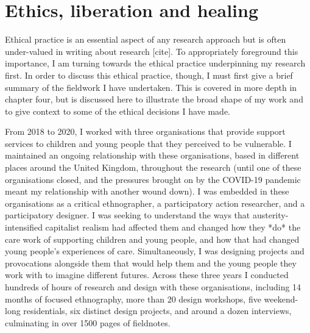 





\section{Ethics, liberation and healing}
\label{3-ethics}
Ethical practice is an essential aspect of any research approach but is often under-valued in writing about research [cite]. To appropriately foreground this importance, I am turning towards the ethical practice underpinning my research first. In order to discuss this ethical practice, though, I must first give a brief summary of the fieldwork I have undertaken. This is covered in more depth in chapter four, but is discussed here to illustrate the broad shape of my work and to give context to some of the ethical decisions I have made.

From 2018 to 2020, I worked with three organisations that provide support services to children and young people that they perceived to be vulnerable. I maintained an ongoing relationship with these organisations, based in different places around the United Kingdom, throughout the research (until one of these organisations closed, and the pressures brought on by the COVID-19 pandemic meant my relationship with another wound down). I was embedded in these organisations as a critical ethnographer, a participatory action researcher, and a participatory designer. I was seeking to understand the ways that austerity-intensified capitalist realism had affected them and changed how they *do* the care work of supporting children and young people, and how that had changed young people’s experiences of care. Simultaneously, I was designing projects and provocations alongside them that would help them and the young people they work with to imagine different futures.  Across these three years I conducted hundreds of hours of research and design with these organisations, including 14 months of focused ethnography, more than 20 design workshops, five weekend-long residentials, six distinct design projects, and around a dozen interviews, culminating in over 1500 pages of fieldnotes.  

